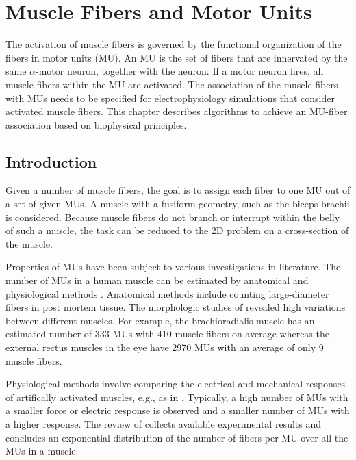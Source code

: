 
\chapter{Muscle Fibers and Motor Units}\label{sec:muscle_fibers_and_motor_units}
The activation of muscle fibers is governed by the functional organization of the fibers in motor units (MU). An MU is the set of fibers that are innervated by the same $\alpha$-motor neuron, together with the neuron. If a motor neuron fires, all muscle fibers within the MU are activated. The association of the muscle fibers with MUs needs to be specified for electrophysiology simulations that consider activated muscle fibers. This chapter describes algorithms to achieve an MU-fiber association based on biophysical principles.

\section{Introduction}\label{sec:mu_intro}
Given a number of muscle fibers, the goal is to assign each fiber to one MU out of a set of given MUs. A muscle with a fusiform geometry, such as the biceps brachii is considered. Because muscle fibers do not branch or interrupt within the belly of such a muscle, the task can be reduced to the 2D problem on a cross-section of the muscle.

Properties of MUs have been subject to various investigations in literature. The number of MUs in a human muscle can be estimated by anatomical and physiological methods \cite{MacIntosh2006}. Anatomical methods include counting large-diameter fibers in post mortem tissue. The morphologic studies of \cite{Feinstein1955} revealed high variations between different muscles. For example, the brachioradialis muscle has an estimated number of \num{333} MUs with \num{410} muscle fibers on average whereas the external rectus muscles in the eye have \num{2970} MUs with an average of only 9 muscle fibers. 

Physiological methods involve comparing the electrical and mechanical responses of artifically activated muscles, e.g., as in \cite{Milner-Brown1973b,Thomas1990b}. Typically, a high number of MUs with a smaller force or electric response is observed and a smaller number of MUs with a higher response. 
The review of \cite{Enoka2001} collects available experimental results and concludes an exponential distribution of the number of fibers per MU over all the MUs in a muscle.

